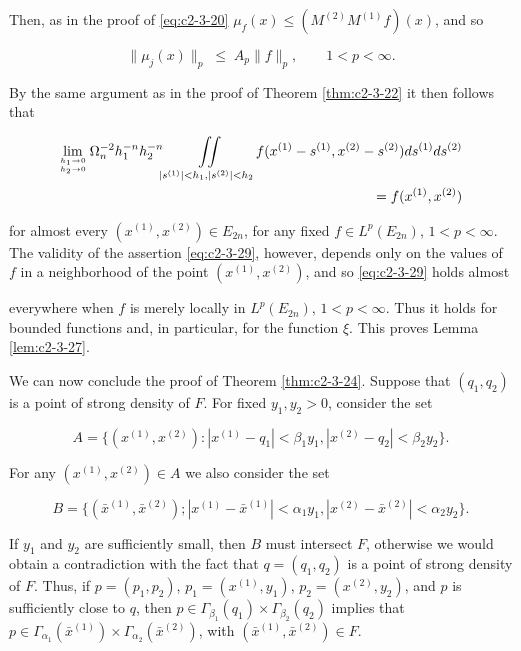 Then, as in the proof of \eqref{eq:c2-3-20} $\mu_f(x) \leq (M^{(2)} M^{(1)} f)(x)$, and so

\begin{equation}\label{eq:c2-3-28}
\|\mu_{j}(x)\|_{p}\;\leq\;A_{p}\|f\|_{p},\qquad1<p<\infty.
\end{equation}

By the same argument as in the proof of Theorem \ref{thm:c2-3-22} it then follows that

\begin{equation}\label{eq:c2-3-29}
\begin{aligned}\lim_{h_{1}\to0\atop h_{2}\to0}\Omega_{n}^{-2}h_{1}^{-n}h_{2}^{-n}\iint\limits_{|s^{(1)}|<h_{1},|s^{(2)}|<h_{2}}f(x^{(1)}-s^{(1)},x^{(2)}-s^{(2)}) ds^{(1)} ds^{(2)}\\=f(x^{(1)},x^{(2)})\end{aligned}
\end{equation}

for almost every $(x^{(1)}, x^{(2)}) \in E_{2n}$, for any fixed $f \in L^p(E_{2n})$, $1 < p < \infty$. The validity of the assertion \eqref{eq:c2-3-29}, however, depends only on the values of $f$ in a neighborhood of the point $(x^{(1)}, x^{(2)})$, and so \eqref{eq:c2-3-29} holds almost

everywhere when $f$ is merely locally in $L^p(E_{2n})$, $1 < p < \infty$. Thus it holds for bounded functions and, in particular, for the function $\xi$. This proves Lemma \ref{lem:c2-3-27}.

We can now conclude the proof of Theorem \ref{thm:c2-3-24}. Suppose that $(q_1, q_2)$ is a point of strong density of $F$. For fixed $y_1, y_2 > 0$, consider the set

\[
A=\{(x^{(1)},x^{(2)})\colon|x^{(1)}-q_{1}|<\beta_{1}y_{1},|x^{(2)}-q_{2}|<\beta_{2}y_{2}\}.
\]

For any $(x^{(1)}, x^{(2)}) \in A$ we also consider the set

\[
B=\{\left(\bar{x}^{(1)},\bar{x}^{(2)}\right);\left|x^{(1)}-\bar{x}^{(1)}\right|<\alpha_{1}y_{1},\left|x^{(2)}-\bar{x}^{(2)}\right|<\alpha_{2}y_{2}\}.
\]

If $y_1$ and $y_2$ are sufficiently small, then $B$ must intersect $F$, otherwise we would obtain a contradiction with the fact that $q = (q_1, q_2)$ is a point of strong density of $F$. Thus, if $p = (p_1, p_2)$, $p_1 = (x^{(1)}, y_1)$, $p_2 = (x^{(2)}, y_2)$, and $p$ is sufficiently close to $q$, then $p \in \Gamma_{\beta_1}(q_1) \times \Gamma_{\beta_2}(q_2)$ implies that $p \in \Gamma_{\alpha_1}(\bar{x}^{(1)}) \times \Gamma_{\alpha_2}(\bar{x}^{(2)})$, with $(\bar{x}^{(1)}, \bar{x}^{(2)}) \in F$.

